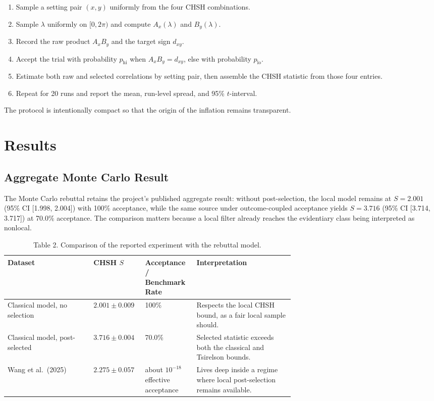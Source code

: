 \documentclass[11pt]{article}
\begin{document}
\begin{enumerate}
  \item Sample a setting pair $(x,y)$ uniformly from the four CHSH combinations.
  \item Sample $\lambda$ uniformly on $[0,2\pi)$ and compute $A_x(\lambda)$ and $B_y(\lambda)$.
  \item Record the raw product $A_x B_y$ and the target sign $d_{xy}$.
  \item Accept the trial with probability $p_{\mathrm{hi}}$ when $A_x B_y = d_{xy}$, else with probability $p_{\mathrm{lo}}$.
  \item Estimate both raw and selected correlations by setting pair, then assemble the CHSH statistic from those four entries.
  \item Repeat for 20 runs and report the mean, run-level spread, and 95\% $t$-interval.
\end{enumerate}

The protocol is intentionally compact so that the origin of the inflation remains transparent.

\section{Results}

\subsection{Aggregate Monte Carlo Result}

The Monte Carlo rebuttal retains the project's published aggregate result: without post-selection, the local model remains at \textbf{$S = 2.001$} (95\% CI [1.998, 2.004]) with 100\% acceptance, while the same source under outcome-coupled acceptance yields \textbf{$S = 3.716$} (95\% CI [3.714, 3.717]) at 70.0\% acceptance. The comparison matters because a local filter already reaches the evidentiary class being interpreted as nonlocal.

\begin{table}[t]
\centering
\caption{Table 2. Comparison of the reported experiment with the rebuttal model.}
\begin{tabularx}{\linewidth}{@{}p{0.30\linewidth}p{0.18\linewidth}p{0.18\linewidth}Y@{}}
\toprule
Dataset & CHSH $S$ & Acceptance / Benchmark Rate & Interpretation \\
\midrule
Classical model, no selection & $2.001 \pm 0.009$ & 100\% & Respects the local CHSH bound, as a fair local sample should. \\
Classical model, post-selected & $3.716 \pm 0.004$ & 70.0\% & Selected statistic exceeds both the classical and Tsirelson bounds. \\
Wang et al.~(2025) & $2.275 \pm 0.057$ & about $10^{-18}$ effective acceptance & Lives deep inside a regime where local post-selection remains available. \\
\bottomrule
\end{tabularx}
\end{table}
\end{document}
